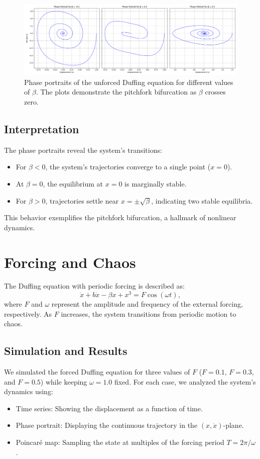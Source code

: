 \documentclass[11pt]{article}
\begin{document}
\begin{figure}[h!]
    \centering
    \includegraphics[width=\textwidth]{unforced_duffing_phase_portraits.png}
    \caption{Phase portraits of the unforced Duffing equation for different values of \(\beta\). The plots demonstrate the pitchfork bifurcation as \(\beta\) crosses zero.}
    \label{fig:unforced_phase_portraits}
\end{figure}

\subsection*{Interpretation}
The phase portraits reveal the system's transitions:
\begin{itemize}
    \item For \(\beta < 0\), the system's trajectories converge to a single point (\(x = 0\)).
    \item At \(\beta = 0\), the equilibrium at \(x = 0\) is marginally stable.
    \item For \(\beta > 0\), trajectories settle near \(x = \pm\sqrt{\beta}\), indicating two stable equilibria.
\end{itemize}
This behavior exemplifies the pitchfork bifurcation, a hallmark of nonlinear dynamics.

\section*{Forcing and Chaos}
The Duffing equation with periodic forcing is described as:
\[
\ddot{x} + b \dot{x} - \beta x + x^3 = F \cos(\omega t),
\]
where \(F\) and \(\omega\) represent the amplitude and frequency of the external forcing, respectively. As \(F\) increases, the system transitions from periodic motion to chaos.

\subsection*{Simulation and Results}
We simulated the forced Duffing equation for three values of \(F\) (\(F = 0.1\), \(F = 0.3\), and \(F = 0.5\)) while keeping \(\omega = 1.0\) fixed. For each case, we analyzed the system's dynamics using:
\begin{itemize}
    \item Time series: Showing the displacement as a function of time.
    \item Phase portrait: Displaying the continuous trajectory in the \((x, \dot{x})\)-plane.
    \item Poincaré map: Sampling the state at multiples of the forcing period \(T = 2\pi/\omega\).
\end{itemize}
\end{document}
